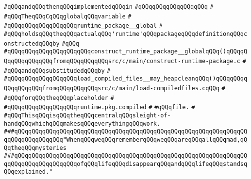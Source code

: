 \verb|#qQQqandqQQqthenqQQqimplementedqQQqin|\newline
\verb|#qQQqqQQqqQQqqQQqqQQq|\newline
\verb|#|\newline
\verb|#qQQqTheqQQqCqQQqglobalqQQqvariable|\newline
\verb|#|\newline
\verb|#qQQqqQQqqQQqqQQqqQQqruntime_package__global|\newline
\verb|#|\newline
\verb|#qQQqholdsqQQqtheqQQqactualqQQq'runtime'qQQqpackageqQQqdefinitionqQQqconstructedqQQqby|\newline
\verb|#qQQq|\newline
\verb|#qQQqqQQqqQQqqQQqqQQqqQQqconstruct_runtime_package__globalqQQq()qQQqqQQqqQQqqQQqqQQqfromqQQqqQQqqQQqsrc/c/main/construct-runtime-package.c|\newline
\verb|#|\newline
\verb|#qQQqandqQQqsubstitudedqQQqby|\newline
\verb|#|\newline
\verb|#qQQqqQQqqQQqqQQqqQQqload_compiled_files__may_heapcleanqQQq()qQQqqQQqqQQqqQQqqQQqfromqQQqqQQqqQQqsrc/c/main/load-compiledfiles.cqQQq|\newline
\verb|#|\newline
\verb|#qQQqforqQQqtheqQQqplaceholder|\newline
\verb|#|\newline
\verb|#qQQqqQQqqQQqqQQqqQQqruntime.pkg.compiled|\newline
\verb|#|\newline
\verb|#qQQqfile.|\newline
\verb|#|\newline
\verb|#qQQqThisqQQqisqQQqtheqQQqcentralqQQqsleight-of-handqQQqwhichqQQqmakesqQQqeverythingqQQqwork.|\newline
\newline
\newline
\newline
\verb|###qQQqqQQqqQQqqQQqqQQqqQQqqQQqqQQqqQQqqQQqqQQqqQQqqQQqqQQqqQQqqQQqqQQqqQQqqQQqqQQqqQQq"WhenqQQqweqQQqrememberqQQqweqQQqareqQQqallqQQqmad,qQQqtheqQQqmysteries|\newline
\verb|###qQQqqQQqqQQqqQQqqQQqqQQqqQQqqQQqqQQqqQQqqQQqqQQqqQQqqQQqqQQqqQQqqQQqqQQqqQQqqQQqqQQqqQQqofqQQqlifeqQQqdisappearqQQqandqQQqlifeqQQqstandsqQQqexplained."|\newline
